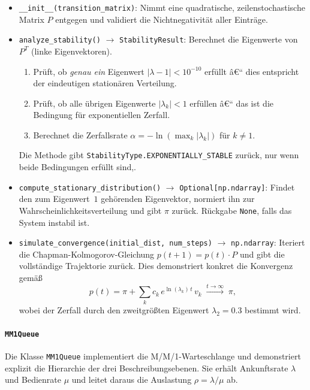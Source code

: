 ﻿\documentclass[a4paper,12pt]{scrreprt}
\theoremstyle{definition}
\begin{document}
\begin{itemize}
	\item \texttt{\_\_init\_\_(transition\_matrix)}: Nimmt eine
	quadratische, zeilenstochastische Matrix $P$ entgegen und
	validiert die Nichtnegativität aller Einträge.
	
	\item \texttt{analyze\_stability()} $\to$ \texttt{StabilityResult}:
	Berechnet die Eigenwerte von $P^T$ (linke Eigenvektoren).
	\begin{enumerate}
		\item Prüft, ob \emph{genau ein} Eigenwert
		$|\lambda - 1| < 10^{-10}$ erfüllt â€“ dies
		entspricht der eindeutigen stationären Verteilung.
		\item Prüft, ob alle übrigen Eigenwerte $|\lambda_k| < 1$
		erfüllen â€“ das ist die Bedingung für exponentiellen
		Zerfall.
		\item Berechnet die Zerfallsrate
		$\alpha = -\ln(\max_k |\lambda_k|)$ für $k \neq 1$.
	\end{enumerate}
	Die Methode gibt \texttt{StabilityType.EXPONENTIALLY\_STABLE} zurück, nur wenn beide Bedingungen erfüllt sind,.
	
	\item \texttt{compute\_stationary\_distribution()} $\to$
	\texttt{Optional[np.ndarray]}:  Findet den zum Eigenwert~$1$
	gehörenden Eigenvektor, normiert ihn zur
	Wahrscheinlichkeitsverteilung und gibt $\pi$ zurück.
	Rückgabe \texttt{None}, falls das System instabil ist.
	
	\item \texttt{simulate\_convergence(initial\_dist, num\_steps)}
	$\to$ \texttt{np.ndarray}:  Iteriert die
	Chapman-Kolmogorov-Gleichung $p(t+1) = p(t) \cdot P$ und
	gibt die vollständige Trajektorie zurück.  Dies demonstriert
	konkret die Konvergenz gemäß
	\[
	p(t) = \pi + \sum_{k} c_k\, e^{\ln(\lambda_k)\,t}\, v_k
	\;\xrightarrow{t\to\infty}\; \pi,
	\]
	wobei der Zerfall durch den zweitgrößten Eigenwert
	$\lambda_2 = 0.3$ bestimmt wird.
\end{itemize}

\paragraph{\texttt{MM1Queue}}

Die Klasse \texttt{MM1Queue} implementiert die M/M/1-Warteschlange
und demonstriert explizit die Hierarchie der drei
Beschreibungsebenen.  Sie erhält Ankunftsrate $\lambda$ und
Bedienrate $\mu$ und leitet daraus die Auslastung $\rho = \lambda/\mu$
ab.
\end{document}
